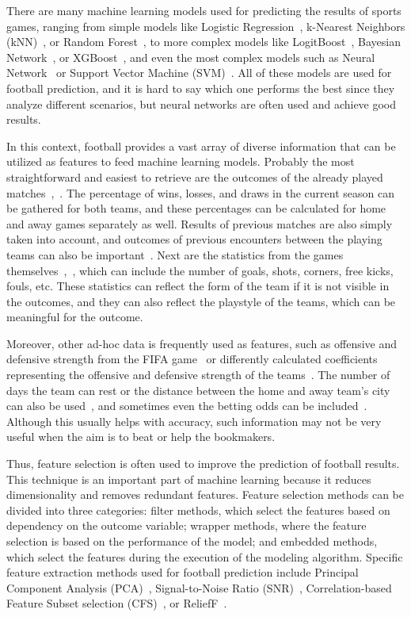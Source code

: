 \documentclass[thesis=M,english]{FITthesis}[2019/12/23]
\begin{document}
There are many machine learning models used for predicting the results of sports games, ranging from simple models like Logistic Regression~\cite{BPL_logistic_regression}, k-Nearest Neighbors (kNN)~\cite{basketball_kNN}, or Random Forest~\cite{football_players}, to more complex models like LogitBoost~\cite{Dutch_football}, Bayesian Network~\cite{Football_Bayesian_network}, or XGBoost~\cite{MLB_regression}, and even the most complex models such as Neural Network~\cite{NBA_convolution} or Support Vector Machine (SVM)~\cite{football_players}. All of these models are used for football prediction, and it is hard to say which one performs the best since they analyze different scenarios, but neural networks are often used and achieve good results.

In this context, football provides a vast array of diverse information that can be utilized as features to feed machine learning models. Probably the most straightforward and easiest to retrieve are the outcomes of the already played matches~\cite{NN_more_sports},~\cite{BPL_ANN_logistic_regression}. The percentage of wins, losses, and draws in the current season can be gathered for both teams, and these percentages can be calculated for home and away games separately as well. Results of previous matches are also simply taken into account, and outcomes of previous encounters between the playing teams can also be important~\cite{Dutch_football}. Next are the statistics from the games themselves~\cite{NFL_first_study},~\cite{basketball_kNN}, which can include the number of goals, shots, corners, free kicks, fouls, etc. These statistics can reflect the form of the team if it is not visible in the outcomes, and they can also reflect the playstyle of the teams, which can be meaningful for the outcome.

Moreover, other ad-hoc data is frequently used as features, such as offensive and defensive strength from the FIFA game~\cite{BPL_logistic_regression} or differently calculated coefficients representing the offensive and defensive strength of the teams~\cite{BPL_ANN_logistic_regression}. The number of days the team can rest or the distance between the home and away team's city can also be used~\cite{Dutch_football}, and sometimes even the betting odds can be included~\cite{NBA_convolution}. Although this usually helps with accuracy, such information may not be very useful when the aim is to beat or help the bookmakers.

Thus, feature selection is often used to improve the prediction of football results. This technique is an important part of machine learning because it reduces dimensionality and removes redundant features. Feature selection methods can be divided into three categories: filter methods, which select the features based on dependency on the outcome variable; wrapper methods, where the feature selection is based on the performance of the model; and embedded methods, which select the features during the execution of the modeling algorithm. Specific feature extraction methods used for football prediction include Principal Component Analysis (PCA)~\cite{Dutch_football}, Signal-to-Noise Ratio (SNR)~\cite{snr}, Correlation-based Feature Subset selection (CFS)~\cite{cfs}, or ReliefF~\cite{Dutch_football}.
\end{document}
